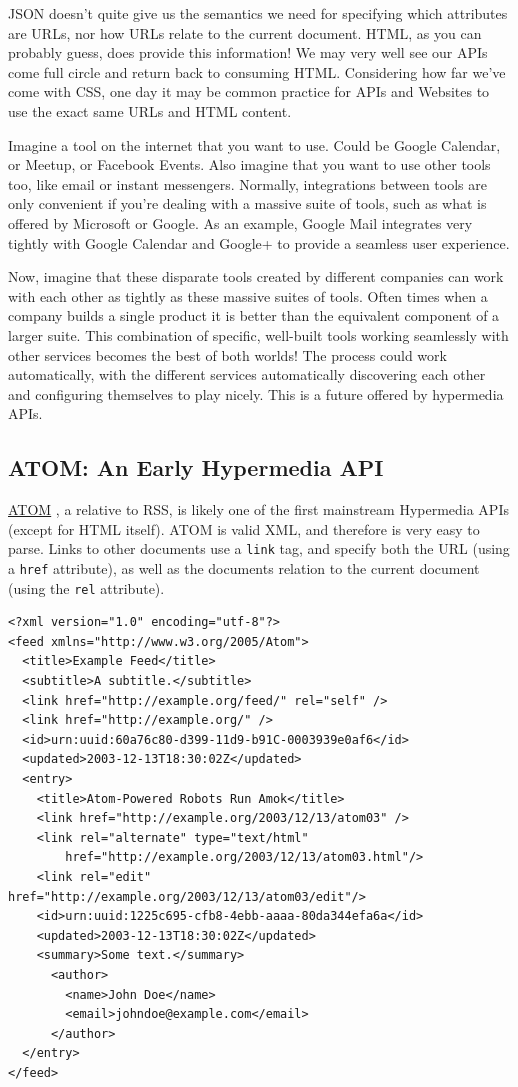 \documentclass{book}
\begin{document}
JSON doesn't quite give us the semantics we need for specifying which attributes are URLs, nor how URLs relate to the current document. HTML, as you can probably guess, does provide this information! We may very well see our APIs come full circle and return back to consuming HTML. Considering how far we've come with CSS, one day it may be common practice for APIs and Websites to use the exact same URLs and HTML content.

Imagine a tool on the internet that you want to use. Could be Google Calendar, or Meetup, or Facebook Events. Also imagine that you want to use other tools too, like email or instant messengers. Normally, integrations between tools are only convenient if you're dealing with a massive suite of tools, such as what is offered by Microsoft or Google. As an example, Google Mail integrates very tightly with Google Calendar and Google+ to provide a seamless user experience.

Now, imagine that these disparate tools created by different companies can work with each other as tightly as these massive suites of tools. Often times when a company builds a single product it is better than the equivalent component of a larger suite. This combination of specific, well-built tools working seamlessly with other services becomes the best of both worlds! The process could work automatically, with the different services automatically discovering each other and configuring themselves to play nicely. This is a future offered by hypermedia APIs.

\subsection{ATOM: An Early Hypermedia API}

\href{https://en.wikipedia.org/wiki/Atom\_\%28standard\%29}{ATOM} \cite{HYPERATOM}, a relative to RSS, is likely one of the first mainstream Hypermedia APIs (except for HTML itself). ATOM is valid XML, and therefore is very easy to parse. Links to other documents use a \texttt{link} tag, and specify both the URL (using a \texttt{href} attribute), as well as the documents relation to the current document (using the \texttt{rel} attribute).

\begin{verbatim}
<?xml version="1.0" encoding="utf-8"?>
<feed xmlns="http://www.w3.org/2005/Atom">
  <title>Example Feed</title>
  <subtitle>A subtitle.</subtitle>
  <link href="http://example.org/feed/" rel="self" />
  <link href="http://example.org/" />
  <id>urn:uuid:60a76c80-d399-11d9-b91C-0003939e0af6</id>
  <updated>2003-12-13T18:30:02Z</updated>
  <entry>
    <title>Atom-Powered Robots Run Amok</title>
    <link href="http://example.org/2003/12/13/atom03" />
    <link rel="alternate" type="text/html"
        href="http://example.org/2003/12/13/atom03.html"/>
    <link rel="edit" href="http://example.org/2003/12/13/atom03/edit"/>
    <id>urn:uuid:1225c695-cfb8-4ebb-aaaa-80da344efa6a</id>
    <updated>2003-12-13T18:30:02Z</updated>
    <summary>Some text.</summary>
      <author>
        <name>John Doe</name>
        <email>johndoe@example.com</email>
      </author>
  </entry>
</feed>
\end{verbatim}
\end{document}
